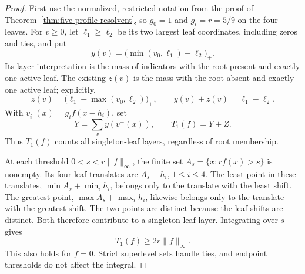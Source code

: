 \begin{proof}
First use the normalized, restricted notation from the proof of
Theorem~\ref{thm:five-profile-resolvent}, so $g_0=1$ and $g_i=r=5/9$
on the four leaves.  For $v\ge0$, let $\ell_1\ge\ell_2$ be its two
largest leaf coordinates, including zeros and ties, and put
\[
 y(v)=\bigl(\min(v_0,\ell_1)-\ell_2\bigr)_+.
\]
Its layer interpretation is the mass of indicators with the root
present and exactly one active leaf.  The existing $z(v)$ is the
mass with the root absent and exactly one active leaf; explicitly,
\[
 z(v)=\bigl(\ell_1-\max(v_0,\ell_2)\bigr)_+,\qquad
 y(v)+z(v)=\ell_1-\ell_2.
\]
With $v_i^+(x)=g_i f(x-h_i)$, set
\[
 Y=\sum_x y(v^+(x)),\qquad T_1(f)=Y+Z.
\]
Thus $T_1(f)$ counts all singleton-leaf layers, regardless of
root membership.

At each threshold $0<s<r\|f\|_\infty$, the finite set
$A_s=\{x:r f(x)>s\}$ is nonempty.  Its four leaf translates are
$A_s+h_i$, $1\le i\le4$.  The least point in these translates,
$\min A_s+\min_i h_i$, belongs only to the translate with the
least shift.  The greatest point, $\max A_s+\max_i h_i$, likewise
belongs only to the translate with the greatest shift.  The two
points are distinct because the leaf shifts are distinct.
Both therefore contribute to a singleton-leaf layer.  Integrating
over $s$ gives
\begin{equation}\label{eq:five-profile-extreme-threshold}
 T_1(f)\ge2r\|f\|_\infty.
\end{equation}
This also holds for $f=0$.  Strict superlevel sets handle ties,
and endpoint thresholds do not affect the integral.


\end{proof}
